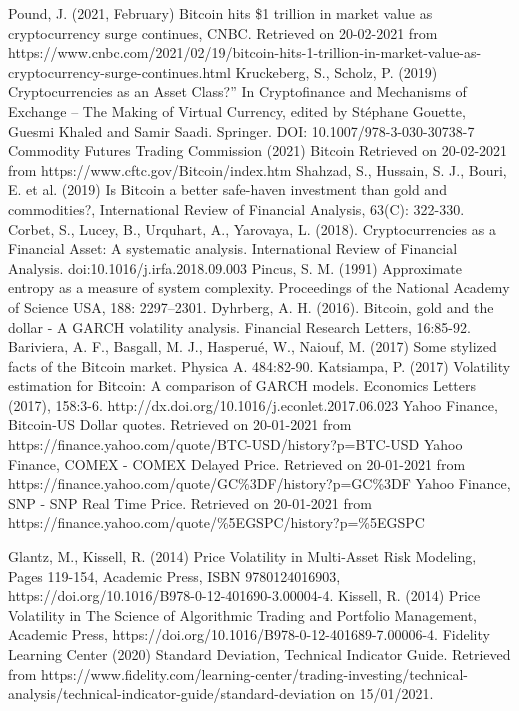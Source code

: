\documentclass[12pt]{article}
\begin{document}
 
 
 
 

 




\begin{thebibliography}{xx}
Pound, J. (2021, February) Bitcoin hits \$1 trillion in market value as cryptocurrency surge continues, CNBC. Retrieved on 20-02-2021 from
https://www.cnbc.com/2021/02/19/bitcoin-hits-1-trillion-in-market-value-as-cryptocurrency-surge-continues.html
Kruckeberg, S., Scholz, P. (2019) Cryptocurrencies as an Asset Class?” In Cryptofinance and Mechanisms of Exchange – The Making of Virtual Currency, edited by Stéphane Gouette, Guesmi Khaled and Samir Saadi. Springer. DOI: 10.1007/978-3-030-30738-7
Commodity Futures Trading Commission (2021) Bitcoin Retrieved on 20-02-2021 from https://www.cftc.gov/Bitcoin/index.htm
Shahzad, S., Hussain, S. J.,  Bouri, E. et al. (2019) Is Bitcoin a better safe-haven investment than gold and commodities?, International Review of Financial Analysis, 63(C): 322-330.
Corbet, S., Lucey, B., Urquhart, A., Yarovaya, L. (2018). Cryptocurrencies as a Financial Asset: A systematic analysis. International Review of Financial Analysis. doi:10.1016/j.irfa.2018.09.003 
Pincus, S. M. (1991) Approximate entropy as a measure of system complexity. Proceedings of the National Academy of Science USA, 188: 2297–2301.
Dyhrberg, A. H. (2016). Bitcoin, gold and the dollar - A GARCH volatility analysis. Financial Research Letters, 16:85-92.
Bariviera, A. F., Basgall, M. J., Hasperué, W., Naiouf, M. (2017) Some stylized facts of the Bitcoin
market. Physica A. 484:82-90.
Katsiampa, P. (2017) Volatility estimation for Bitcoin: A comparison of
GARCH models. Economics Letters (2017), 158:3-6. http://dx.doi.org/10.1016/j.econlet.2017.06.023
Yahoo Finance, Bitcoin-US Dollar quotes. Retrieved on 20-01-2021 from https://finance.yahoo.com/quote/BTC-USD/history?p=BTC-USD
Yahoo Finance, COMEX - COMEX Delayed Price. Retrieved on 20-01-2021 from https://finance.yahoo.com/quote/GC\%3DF/history?p=GC\%3DF
Yahoo Finance, SNP - SNP Real Time Price. Retrieved on 20-01-2021 from https://finance.yahoo.com/quote/\%5EGSPC/history?p=\%5EGSPC



Glantz, M., Kissell, R. (2014) Price Volatility in Multi-Asset Risk Modeling,  Pages 119-154, Academic Press,
ISBN 9780124016903, https://doi.org/10.1016/B978-0-12-401690-3.00004-4.
Kissell, R. (2014) Price Volatility in The Science of Algorithmic Trading and Portfolio Management, Academic Press, https://doi.org/10.1016/B978-0-12-401689-7.00006-4.
Fidelity Learning Center (2020) Standard Deviation, Technical Indicator Guide. Retrieved from https://www.fidelity.com/learning-center/trading-investing/technical-analysis/technical-indicator-guide/standard-deviation on 15/01/2021. 


\end{thebibliography}
\end{document}
